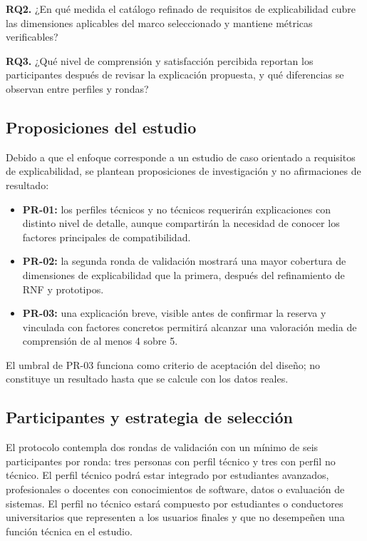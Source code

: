 \documentclass[12pt,a4paper]{article}
\begin{document}
\textbf{RQ2.} ¿En qué medida el catálogo refinado de requisitos de explicabilidad cubre las dimensiones aplicables del marco seleccionado y mantiene métricas verificables?

\textbf{RQ3.} ¿Qué nivel de comprensión y satisfacción percibida reportan los participantes después de revisar la explicación propuesta, y qué diferencias se observan entre perfiles y rondas?

\subsection{Proposiciones del estudio}

Debido a que el enfoque corresponde a un estudio de caso orientado a requisitos de explicabilidad, se plantean proposiciones de investigación y no afirmaciones de resultado:

\begin{itemize}
  \item \textbf{PR-01:} los perfiles técnicos y no técnicos requerirán explicaciones con distinto nivel de detalle, aunque compartirán la necesidad de conocer los factores principales de compatibilidad.
  \item \textbf{PR-02:} la segunda ronda de validación mostrará una mayor cobertura de dimensiones de explicabilidad que la primera, después del refinamiento de RNF y prototipos.
  \item \textbf{PR-03:} una explicación breve, visible antes de confirmar la reserva y vinculada con factores concretos permitirá alcanzar una valoración media de comprensión de al menos 4 sobre 5.
\end{itemize}

El umbral de PR-03 funciona como criterio de aceptación del diseño; no constituye un resultado hasta que se calcule con los datos reales.

\subsection{Participantes y estrategia de selección}

El protocolo contempla dos rondas de validación con un mínimo de seis participantes por ronda: tres personas con perfil técnico y tres con perfil no técnico. El perfil técnico podrá estar integrado por estudiantes avanzados, profesionales o docentes con conocimientos de software, datos o evaluación de sistemas. El perfil no técnico estará compuesto por estudiantes o conductores universitarios que representen a los usuarios finales y que no desempeñen una función técnica en el estudio.
\end{document}
